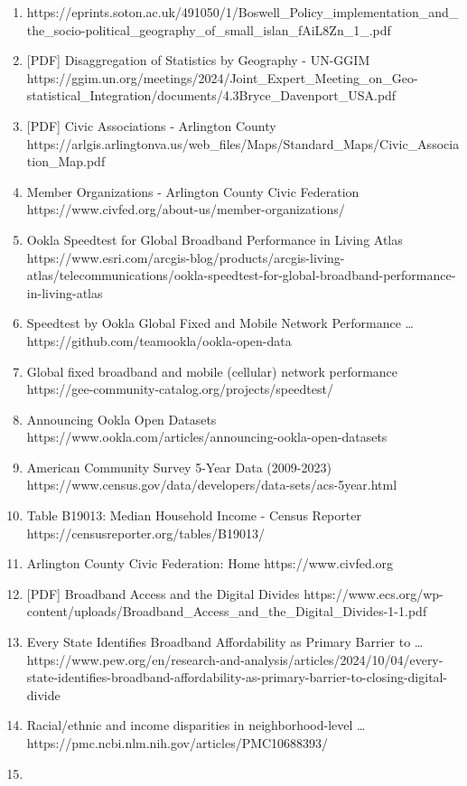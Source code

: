 \documentclass[
  letterpaper,
  DIV=11,
  numbers=noendperiod]{scrartcl}
\begin{document}
\begin{enumerate}
\item
  https://eprints.soton.ac.uk/491050/1/Boswell\_Policy\_implementation\_and\_the\_socio-political\_geography\_of\_small\_islan\_fAiL8Zn\_1\_.pdf
\item
  {[}PDF{]} Disaggregation of Statistics by Geography - UN-GGIM
  https://ggim.un.org/meetings/2024/Joint\_Expert\_Meeting\_on\_Geo-statistical\_Integration/documents/4.3Bryce\_Davenport\_USA.pdf
\item
  {[}PDF{]} Civic Associations - Arlington County
  https://arlgis.arlingtonva.us/web\_files/Maps/Standard\_Maps/Civic\_Association\_Map.pdf
\item
  Member Organizations - Arlington County Civic Federation
  https://www.civfed.org/about-us/member-organizations/
\item
  Ookla Speedtest for Global Broadband Performance in Living Atlas
  https://www.esri.com/arcgis-blog/products/arcgis-living-atlas/telecommunications/ookla-speedtest-for-global-broadband-performance-in-living-atlas
\item
  Speedtest by Ookla Global Fixed and Mobile Network Performance
  \ldots{} https://github.com/teamookla/ookla-open-data
\item
  Global fixed broadband and mobile (cellular) network performance
  https://gee-community-catalog.org/projects/speedtest/
\item
  Announcing Ookla Open Datasets
  https://www.ookla.com/articles/announcing-ookla-open-datasets
\item
  American Community Survey 5-Year Data (2009-2023)
  https://www.census.gov/data/developers/data-sets/acs-5year.html
\item
  Table B19013: Median Household Income - Census Reporter
  https://censusreporter.org/tables/B19013/
\item
  Arlington County Civic Federation: Home https://www.civfed.org
\item
  {[}PDF{]} Broadband Access and the Digital Divides
  https://www.ecs.org/wp-content/uploads/Broadband\_Access\_and\_the\_Digital\_Divides-1-1.pdf
\item
  Every State Identifies Broadband Affordability as Primary Barrier to
  \ldots{}
  https://www.pew.org/en/research-and-analysis/articles/2024/10/04/every-state-identifies-broadband-affordability-as-primary-barrier-to-closing-digital-divide
\item
  Racial/ethnic and income disparities in neighborhood-level \ldots{}
  https://pmc.ncbi.nlm.nih.gov/articles/PMC10688393/
\item

\end{enumerate}
\end{document}
